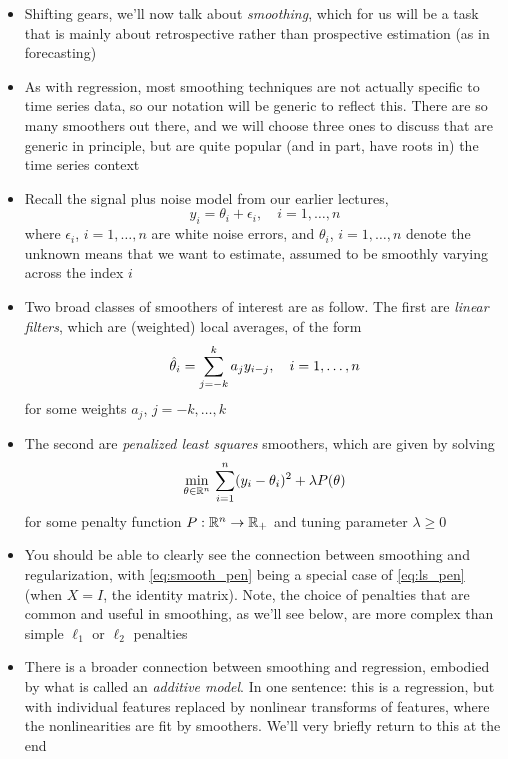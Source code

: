 \documentclass{article}
\begin{document}
\begin{itemize}
\item Shifting gears, we'll now talk about \emph{smoothing}, which for us will
  be a task that is mainly about retrospective rather than prospective
  estimation (as in forecasting)

\item As with regression, most smoothing techniques are not actually specific to
  time series data, so our notation will be generic to reflect this. There are
  so many smoothers out there, and we will choose three ones to discuss that are
  generic in principle, but are quite popular (and in part, have roots in) the
  time series context  

\item Recall the signal plus noise model from our earlier lectures, 
  \[
  y_i = \theta_i + \epsilon_i, \quad i = 1,\dots,n
  \]
  where $\epsilon_i$, $i=1,\dots,n$ are white noise errors, and $\theta_i$, $i =
  1,\dots,n$ denote the unknown means that we want to estimate, assumed to be
  smoothly varying across the index $i$

\item Two broad classes of smoothers of interest are as follow. The first are
  \emph{linear filters}, which are (weighted) local averages, of the form  
  \begin{equation}
  \label{eq:smooth_lin}
  \hat{\theta}_i = \sum_{j=-k}^k a_j y_{i-j},\quad i = 1,\dots,n
  \end{equation}
  for some weights $a_j$, $j = -k,\dots,k$

\item The second are \emph{penalized least squares} smoothers, which are given
  by solving    
  \begin{equation}
  \label{eq:smooth_pen}
  \min_{\theta \in \mathbb{R}^n} \, \sum_{i=1}^n (y_i - \theta_i)^2 + \lambda P(\theta) 
  \end{equation}
  for some penalty function $P : \mathbb{R}^n \to \mathbb{R}_+$ and tuning parameter $\lambda 
  \geq 0$   

\item You should be able to clearly see the connection between smoothing and
  regularization, with \eqref{eq:smooth_pen} being a special case of
  \eqref{eq:ls_pen} (when $X = I$, the identity matrix). Note, the choice of
  penalties that are common and useful in smoothing, as we'll see below, are
  more complex than simple $\ell_1$ or $\ell_2$ penalties  

\item There is a broader connection between smoothing and regression, embodied
  by what is called an \emph{additive model}. In one sentence: this is a
  regression, but with individual features replaced by nonlinear transforms of
  features, where the nonlinearities are fit by smoothers. We'll very briefly
  return to this at the end
\end{itemize}
\end{document}
